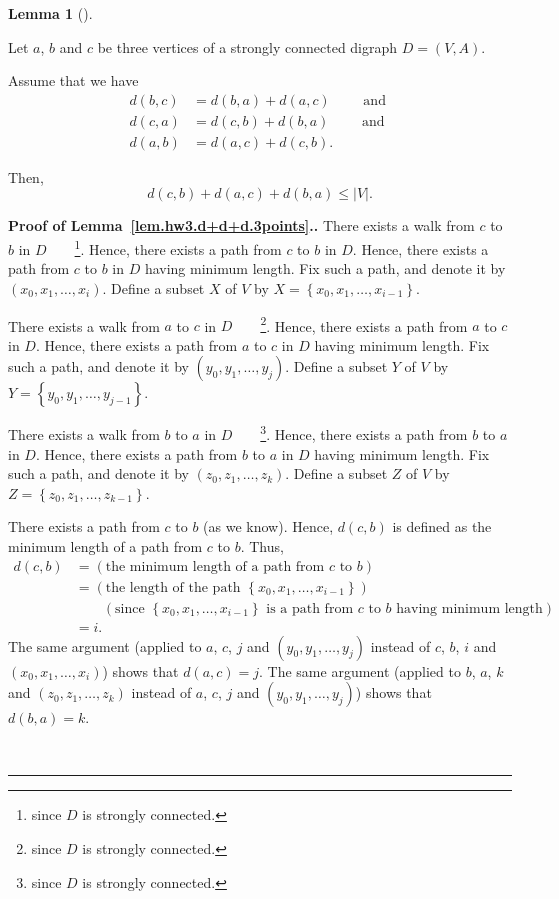 \documentclass[numbers=enddot,12pt,final,onecolumn,notitlepage]{scrartcl}%
\theoremstyle{definition}
\newtheorem{lem}[theo]{Lemma}
\newenvironment{lemma}[1][]
{\begin{lem}[#1]\begin{leftbar}}
{\end{leftbar}\end{lem}}
\newenvironment{proof}[1][Proof]{\noindent\textbf{#1.} }{\ \rule{0.5em}{0.5em}}
\newcommand{\set}[1]{\left\{ #1 \right\}}
\newcommand{\abs}[1]{\left| #1 \right|}
\newcommand{\tup}[1]{\left( #1 \right)}
\begin{document}
\begin{lemma} \label{lem.hw3.d+d+d.3points}
Let $a$, $b$ and $c$ be three vertices of a strongly connected
digraph $D = \tup{V, A}$.

Assume that we have
\begin{align*}
d \tup{b, c} &= d \tup{b, a} + d \tup{a, c} \qquad \text{ and } \\
d \tup{c, a} &= d \tup{c, b} + d \tup{b, a} \qquad \text{ and } \\
d \tup{a, b} &= d \tup{a, c} + d \tup{c, b} .
\end{align*}

Then,
\[
d \tup{c, b} + d \tup{a, c} + d \tup{b, a} \leq \abs{V} .
\]
\end{lemma}

\begin{proof}[Proof of Lemma~\ref{lem.hw3.d+d+d.3points}.]
There exists a walk from $c$ to $b$ in $D$\ \ \ \ \footnote{since $D$
is strongly connected.}.
Hence, there exists a path from $c$ to $b$ in $D$.
Hence, there exists a path from $c$ to $b$ in $D$ having minimum
length.
Fix such a path, and denote it by $\tup{x_0, x_1, \ldots, x_i}$.
Define a subset $X$ of $V$ by $X = \set{x_0, x_1, \ldots, x_{i-1}}$.

There exists a walk from $a$ to $c$ in $D$\ \ \ \ \footnote{since $D$
is strongly connected.}.
Hence, there exists a path from $a$ to $c$ in $D$.
Hence, there exists a path from $a$ to $c$ in $D$ having minimum
length.
Fix such a path, and denote it by $\tup{y_0, y_1, \ldots, y_j}$.
Define a subset $Y$ of $V$ by $Y = \set{y_0, y_1, \ldots, y_{j-1}}$.

There exists a walk from $b$ to $a$ in $D$\ \ \ \ \footnote{since $D$
is strongly connected.}.
Hence, there exists a path from $b$ to $a$ in $D$.
Hence, there exists a path from $b$ to $a$ in $D$ having minimum
length.
Fix such a path, and denote it by $\tup{z_0, z_1, \ldots, z_k}$.
Define a subset $Z$ of $V$ by $Z = \set{z_0, z_1, \ldots, z_{k-1}}$.

There exists a path from $c$ to $b$ (as we know).
Hence, $d \tup{c, b}$ is defined as the minimum length of a path from
$c$ to $b$.
Thus,
\begin{align*}
d \tup{c, b}
&= \tup{\text{the minimum length of a path from } c \text{ to } b } \\
&= \tup{\text{the length of the path } \set{x_0, x_1, \ldots, x_{i-1}}
       } \\
&\qquad \left(\text{since } \set{x_0, x_1, \ldots, x_{i-1}}
                \text{ is a path from } c \text{ to } b
                \text{ having minimum length}\right) \\
&= i .
\end{align*}
The same argument (applied to $a$, $c$, $j$ and
$\tup{y_0, y_1, \ldots, y_j}$ instead of $c$, $b$, $i$ and
$\tup{x_0, x_1, \ldots, x_i}$) shows that $d \tup{a, c} = j$.
The same argument (applied to $b$, $a$, $k$ and
$\tup{z_0, z_1, \ldots, z_k}$ instead of $a$, $c$, $j$ and
$\tup{y_0, y_1, \ldots, y_j}$) shows that $d \tup{b, a} = k$.


\end{proof}
\end{document}
